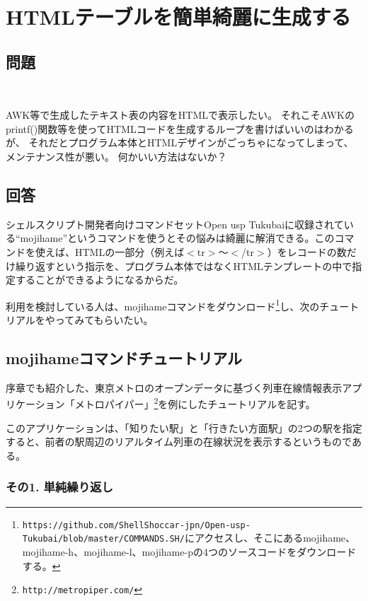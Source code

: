 \section{HTMLテーブルを簡単綺麗に生成する}
\label{recipe:mojihame}

\subsection*{問題}
\noindent
$\!\!\!\!\!$
\begin{grshfboxit}{160.0mm}
	AWK等で生成したテキスト表の内容をHTMLで表示したい。
	それこそAWKのprintf()関数等を使ってHTMLコードを生成するループを書けばいいのはわかるが、
	それだとプログラム本体とHTMLデザインがごっちゃになってしまって、メンテナンス性が悪い。
	何かいい方法はないか？
\end{grshfboxit}

\subsection*{回答}
シェルスクリプト開発者向けコマンドセットOpen usp Tukubaiに収録されている``mojihame''というコマンドを使うとその悩みは綺麗に解消できる。このコマンドを使えば、HTMLの一部分（例えば$<$tr$>$～$<$/tr$>$）をレコードの数だけ繰り返すという指示を、プログラム本体ではなくHTMLテンプレートの中で指定することができるようになるからだ。

利用を検討している人は、mojihameコマンドをダウンロード\footnote{\verb|https://github.com/ShellShoccar-jpn/Open-usp-Tukubai/blob/master/COMMANDS.SH/|にアクセスし、そこにあるmojihame、mojihame-h、mojihame-l、mojihame-pの4つのソースコードをダウンロードする。}し、次のチュートリアルをやってみてもらいたい。

\subsection*{mojihameコマンドチュートリアル}

序章でも紹介した、東京メトロのオープンデータに基づく列車在線情報表示アプリケーション「メトロパイパー」\footnote{\verb|http://metropiper.com/|}を例にしたチュートリアルを記す。

このアプリケーションは、「知りたい駅」と「行きたい方面駅」の2つの駅を指定すると、前者の駅周辺のリアルタイム列車の在線状況を表示するというものである。

\subsubsection*{その1. 単純繰り返し}

